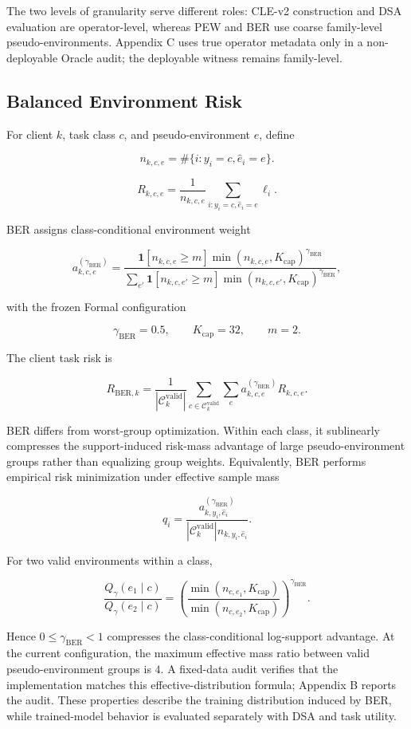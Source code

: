 The two levels of granularity serve different roles: CLE-v2 construction and DSA evaluation are operator-level, whereas PEW and BER use coarse family-level pseudo-environments. Appendix C uses true operator metadata only in a non-deployable Oracle audit; the deployable witness remains family-level.

\subsection{Balanced Environment Risk}

For client \(k\), task class \(c\), and pseudo-environment \(e\), define

\[
n_{k,c,e}=\#\{i:y_i=c,\hat e_i=e\}.
\]

\[
R_{k,c,e}=\frac1{n_{k,c,e}}\sum_{i:y_i=c,\hat e_i=e}\ell_i.
\]

BER assigns class-conditional environment weight

\[
a^{(\gamma_{\mathrm{BER}})}_{k,c,e}
=
\frac{
\mathbf 1[n_{k,c,e}\ge m]
\min(n_{k,c,e},K_{\mathrm{cap}})^{\gamma_{\mathrm{BER}}}
}{
\sum_{e'}
\mathbf 1[n_{k,c,e'}\ge m]
\min(n_{k,c,e'},K_{\mathrm{cap}})^{\gamma_{\mathrm{BER}}}
},
\]

with the frozen Formal configuration

\[
\gamma_{\mathrm{BER}}=0.5,\qquad K_{\mathrm{cap}}=32,\qquad m=2.
\]

The client task risk is

\[
R_{\mathrm{BER},k}
=
\frac1{|\mathcal C_k^{\mathrm{valid}}|}
\sum_{c\in\mathcal C_k^{\mathrm{valid}}}
\sum_e a^{(\gamma_{\mathrm{BER}})}_{k,c,e}R_{k,c,e}.
\]

BER differs from worst-group optimization. Within each class, it sublinearly compresses the support-induced risk-mass advantage of large pseudo-environment groups rather than equalizing group weights. Equivalently, BER performs empirical risk minimization under effective sample mass

\[
q_i=
\frac{a^{(\gamma_{\mathrm{BER}})}_{k,y_i,\hat e_i}}
{|\mathcal C_k^{\mathrm{valid}}|n_{k,y_i,\hat e_i}}.
\]

For two valid environments within a class,

\[
\frac{Q_\gamma(e_1\mid c)}{Q_\gamma(e_2\mid c)}
=
\left(
\frac{\min(n_{c,e_1},K_{\mathrm{cap}})}
{\min(n_{c,e_2},K_{\mathrm{cap}})}
\right)^{\gamma_{\mathrm{BER}}}.
\]

Hence \(0\le\gamma_{\mathrm{BER}}<1\) compresses the class-conditional log-support advantage. At the current configuration, the maximum effective mass ratio between valid pseudo-environment groups is \(4\). A fixed-data audit verifies that the implementation matches this effective-distribution formula; Appendix B reports the audit. These properties describe the training distribution induced by BER, while trained-model behavior is evaluated separately with DSA and task utility.
